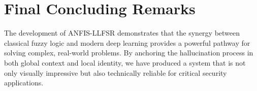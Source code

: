 \section{Final Concluding Remarks}
The development of ANFIS-LLFSR demonstrates that the synergy between classical fuzzy logic and modern deep learning provides a powerful pathway for solving complex, real-world problems. By anchoring the hallucination process in both global context and local identity, we have produced a system that is not only visually impressive but also technically reliable for critical security applications.

